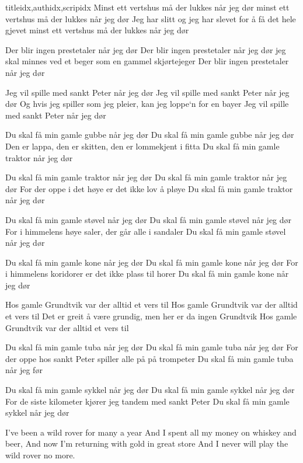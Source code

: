 \documentclass[14pt,letterpaper,norsk]{article}
\begin{document}
\begin{songs}{titleidx,authidx,scripidx}
\beginverse
Minst ett vertshus må der lukkes når jeg dør
minst ett vertshus må der lukkes når jeg dør
Jeg har slitt og jeg har slevet for å få det hele gjevet
minst ett vertshus må der lukkes når jeg dør
\endverse

\beginverse
Der blir ingen prestetaler når jeg dør
Der blir ingen prestetaler når jeg dør
jeg skal minnes ved et beger som en gammel skjørtejeger
Der blir ingen prestetaler når jeg dør
\endverse

\beginverse
Jeg vil spille med sankt Peter når jeg dør
Jeg vil spille med sankt Peter når jeg dør
Og hvis jeg spiller som jeg pleier, kan jeg loppe`n for en bayer
Jeg vil spille med sankt Peter når jeg dør
\endverse

\beginverse
Du skal få min gamle gubbe når jeg dør
Du skal få min gamle gubbe når jeg dør
Den er lappa, den er skitten, den er lommekjent i fitta
Du skal få min gamle traktor når jeg dør
\endverse

\beginverse
Du skal få min gamle traktor når jeg dør
Du skal få min gamle traktor når jeg dør
For der oppe i det høye er det ikke lov å pløye
Du skal få min gamle traktor når jeg dør
\endverse

\beginverse
Du skal få min gamle støvel når jeg dør
Du skal få min gamle støvel når jeg dør
For i himmelens høye saler, der går alle i sandaler
Du skal få min gamle støvel når jeg dør
\endverse

\beginverse
Du skal få min gamle kone når jeg dør
Du skal få min gamle kone når jeg dør
For i himmelens koridorer er det ikke plass til horer
Du skal få min gamle kone når jeg dør
\endverse

\beginverse
Hos gamle Grundtvik var der alltid et vers til
Hos gamle Grundtvik var der alltid et vers til
Det er greit å være grundig, men her er da ingen Grundtvik
Hos gamle Grundtvik var der alltid et vers til
\endverse

\beginverse
Du skal få min gamle tuba når jeg dør
Du skal få min gamle tuba når jeg dør
For der oppe hos sankt Peter spiller alle på på trompeter
Du skal få min gamle tuba når jeg før
\endverse

\beginverse
Du skal få min gamle sykkel når jeg dør
Du skal få min gamle sykkel når jeg dør
For de siste kilometer kjører jeg tandem med sankt Peter
Du skal få min gamle sykkel når jeg dør
\endverse

\endsong

\beginverse
I've been a wild rover for many a year 
And I spent all my money on whiskey and beer, 
And now I'm returning with gold in great store 
And I never will play the wild rover no more. 
\endverse


\end{songs}
\end{document}
